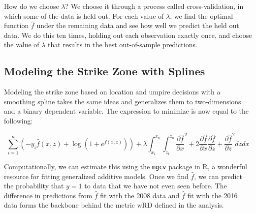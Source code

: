 \documentclass[11pt]{article}
\begin{document}
How do we choose $\lambda$?  We choose it through a process called cross-validation, in which some of the data is held out.  For each value of $\lambda$, we find the optimal function $\hat{f}$ under the remaining data and see how well we predict the held out data.  We do this ten times, holding out each observation exactly once, and choose the value of $\lambda$ that results in the best out-of-sample predictions. \\

\subsection{Modeling the Strike Zone with Splines}
Modeling the strike zone based on location and umpire decisions with a smoothing spline takes the same ideas and generalizes them to two-dimensions and a binary dependent variable.  The expression to minimize is now equal to the following:

\begin{equation}
\sum_{i = 1}^n (-y_i \hat{f}(x,z) + \log(1 + e^{\hat{f}(x,z)})) + \lambda \int_{x_1}^{x_n} \int_{z_1}^{z_n}\frac{\partial\hat{f}}{\partial x}^2 + 2 \frac{\partial\hat{f}}{\partial x}\frac{\partial\hat{f}}{\partial z} + \frac{\partial\hat{f}}{\partial z}^2dz dx
\end{equation}    

Computationally, we can estimate this using the \texttt{mgcv} package in R,  a wonderful resource for fitting generalized additive models.  Once we find $\hat{f}$, we can predict the probability that $y = 1$ to data that we have not even seen before.  The difference in predictions from $\hat{f}$ fit with the 2008 data and $\hat{f}$ fit with the 2016 data forms the backbone behind the metric wRD defined in the analysis. 
\newpage 
\end{document}
